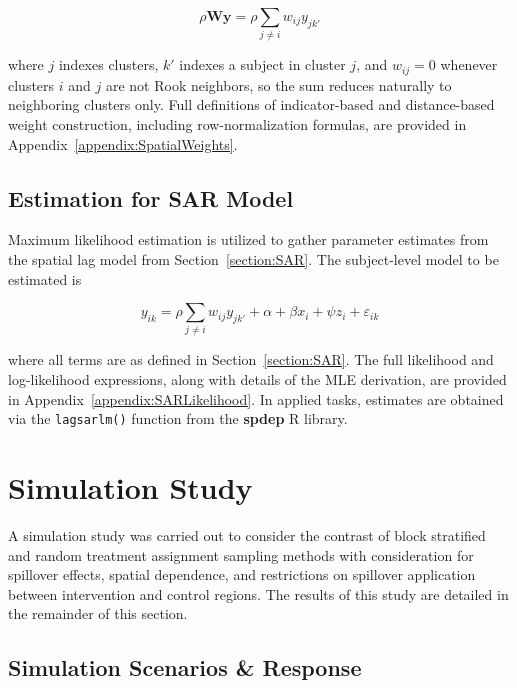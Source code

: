 \documentclass{article}[11pt]
\begin{document}
\begin{equation}\label{Equation:SpatialDepTerm}
    \rho\mathbf{Wy} = \rho\sum_{j \neq i}w_{ij}y_{jk'}
\end{equation}

where $j$ indexes clusters, $k'$ indexes a subject in cluster $j$, and $w_{ij} = 0$ whenever clusters $i$ and $j$ are not Rook neighbors, so the sum reduces naturally to neighboring clusters only. Full definitions of indicator-based and distance-based weight construction, including row-normalization formulas, are provided in Appendix~\ref{appendix:SpatialWeights}.

\subsection{Estimation for SAR Model}

Maximum likelihood estimation is utilized to gather parameter estimates from the spatial lag model from Section~\ref{section:SAR}\cite{ord_estimation_1975}\cite{bivand_comparing_2015}\cite{bivand_computing_2013}. The subject-level model to be estimated is

\begin{equation}\label{Equation:SARestimation}
    y_{ik} = \rho \sum_{j\neq i}w_{ij}y_{jk'} + \alpha + \beta x_i + \psi z_i + \varepsilon_{ik}
\end{equation}

where all terms are as defined in Section~\ref{section:SAR}. The full likelihood and log-likelihood expressions, along with details of the MLE derivation, are provided in Appendix~\ref{appendix:SARLikelihood}. In applied tasks, estimates are obtained via the \texttt{lagsarlm()} function from the \textbf{spdep} R library\cite{bivand_r_2022}.

\section{Simulation Study}\label{section:Results}

A simulation study was carried out to consider the contrast of block stratified and random treatment assignment sampling methods with consideration for spillover effects, spatial dependence, and restrictions on spillover application between intervention and control regions. The results of this study are detailed in the remainder of this section.

\subsection{Simulation Scenarios \& Response}
\end{document}
